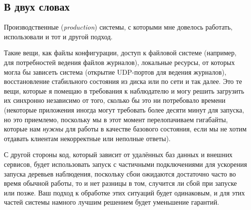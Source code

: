 \documentclass[11pt, oneside]{book}   	%
\begin{document}
\subsection{В двух словах}
\label{subsec:start-link-in-a-nutshell}

Производственные (\emph{production}) системы, с которыми мне довелось работать, использовали и тот и другой подход.

Такие вещи, как файлы конфигурации, доступ к файловой системе (например, для потребностей ведения файлов журналов), локальные ресурсы, от которых могла бы зависеть система (открытие UDP-портов для ведения журналов), восстановление стабильного состояния из диска или по сети и так далее. Это те вещи, которые я помещаю в требования к наблюдателю и могу решить загрузить их синхронно независимо от того, сколько бы это ни потребовало времени (некоторые приложения иногда могут требовать более десяти минут для запуска, но это приемлемо, поскольку мы в этот момент перелопачиваем гигабайты, которые нам \emph{нужны} для работы в качестве базового состояния, если мы не хотим отдавать клиентам некорректные или неполные ответы).

С другой стороны код, который зависит от удалённых баз данных и внешних сервисов, будет использовать запуск с частичными подключениями для ускорения запуска деревьев наблюдения, поскольку сбои ожидаются достаточно часто во время обычной работы, то и нет разницы в том, случится ли сбой при запуске или позже. Ваш подход к обработке этих ситуаций будет одинаковым, и для этих частей системы намного лучшим решением будет уменьшение гарантий.
\end{document}
